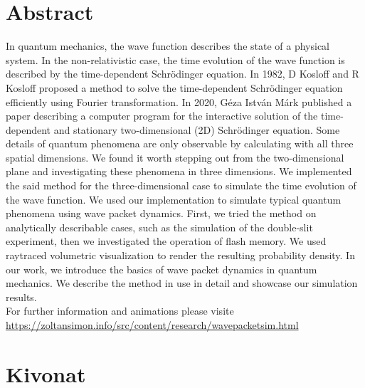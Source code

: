\section*{Abstract}

In quantum mechanics, the wave function describes the state of a physical system. In the non-relativistic case, the time evolution of the wave function is described by the time-dependent Schrödinger equation. In 1982, D Kosloff and R Kosloff proposed a method \cite{KOSLOFF198335} to solve the time-dependent Schrödinger equation efficiently using Fourier transformation. In 2020, Géza István Márk published a paper \cite{mark2020webschrodinger} describing a computer program for the interactive solution of the time-dependent and stationary two-dimensional (2D) Schrödinger equation. Some details of quantum phenomena are only observable by calculating with all three spatial dimensions. We found it worth stepping out from the two-dimensional plane and investigating these phenomena in three dimensions. We implemented the said method for the three-dimensional case to simulate the time evolution of the wave function. We used our implementation to simulate typical quantum phenomena using wave packet dynamics. First, we tried the method on analytically describable cases, such as the simulation of the double-slit experiment, then we investigated the operation of flash memory. We used raytraced volumetric visualization to render the resulting probability density. In our work, we introduce the basics of wave packet dynamics in quantum mechanics. We describe the method in use in detail and showcase our simulation results.\\
For further information and animations please visite\\ \url{https://zoltansimon.info/src/content/research/wavepacketsim.html}

\section*{Kivonat}

